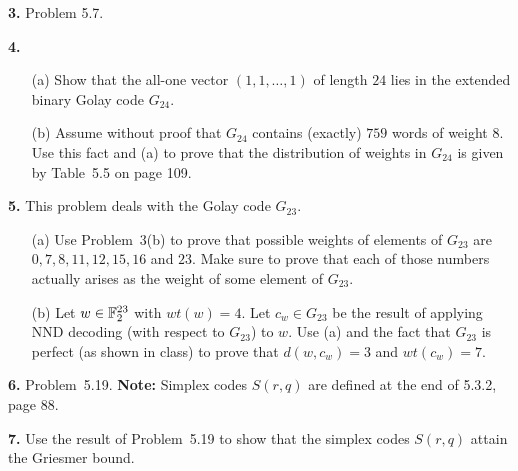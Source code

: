 \documentclass[12pt]{amsart}
\begin{document}
{\bf 3.} Problem 5.7. 
\skv

{\bf 4.}
\begin{itemize}
\item[(a)] Show that the all-one vector $(1, 1,\ldots , 1)$ of length $24$ lies in the extended binary Golay code $G_{24}$.
\item[(b)] Assume without proof that $G_{24}$ contains (exactly) $759$ words of weight $8$. Use this fact and (a) to prove that the distribution of weights in $G_{24}$ is given by Table~5.5 on page 109. 
\end{itemize}
\skv


{\bf 5.} This problem deals with the Golay code $G_{23}$.
\begin{itemize}
\item[(a)] Use Problem~3(b) to prove that possible weights of elements of $G_{23}$ are $0,7,8,11,12,15,16$ and $23$. Make sure to prove that each of those numbers actually arises as the weight of some element of $G_{23}$.
\item[(b)] Let $w\in {\mathbb F}_2^{23}$ with $wt(w)=4$. Let $c_{w}\in G_{23}$ be the result of applying NND decoding (with respect to $G_{23}$) to $w$.
Use (a) and the fact that $G_{23}$ is perfect (as shown in class) to prove that $d(w,c_w)=3$ and $wt(c_w)=7$. 
\end{itemize}
\skv

{\bf 6.} Problem~5.19. {\bf Note:} Simplex codes $S(r,q)$ are defined at the end of 5.3.2, page 88.
\skv

{\bf 7.} Use the result of Problem~5.19 to show that the simplex codes $S(r,q)$ attain the Griesmer bound.
\skv
\end{document}
